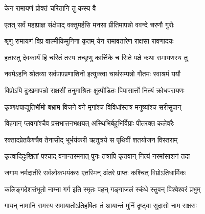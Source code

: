  

\onelineshloka
{केन रामायणं प्रोक्तं चरितानि तु कस्य वै}%

 

\twolineshloka
{एतत् सर्वं महाप्राज्ञ संक्षेपाद् वक्तुमर्हसि}
{मनसा प्रीतिमापन्नो ववन्दे चरणौ गुरोः}%

 


\twolineshloka
{श्रृणु रामायणं विप्र वाल्मीकिमुनिना कृतम्}
{येन रामावतारेण राक्षसा रावणादयः}%

 

\twolineshloka
{हतास्तु देवकार्यं हि चरितं तस्य तच्छृणु}
{कार्त्तिके च सिते पक्षे कथा रामायणस्य तु}%

 

\twolineshloka
{नवमेऽहनि श्रोतव्या सर्वपापप्रणाशिनी}
{इत्युक्त्वा चार्थसम्पन्नो गौतमः स्वाश्रमं ययौ}%

 

\twolineshloka
{विप्रोऽपि दुःखमापन्नो राक्षसीं तनुमाश्रितः}
{क्षुत्पीडितः पिपासार्त्तो नित्यं क्रोधपरायणः}%

 

\twolineshloka
{कृष्णक्षपाद्युतिर्भीमो बभ्राम विजने वने}
{मृगांश्च विविधांस्तत्र मनुष्यांश्च सरीसुपान्}%

 

\twolineshloka
{विहगान् प्लवगांश्चैव प्रसभात्तनभक्षयत्}
{अस्थिभिर्बहुभिर्विप्राः पीतरक्त कलेवरैः}%

 

\twolineshloka
{रक्तादप्रेतकैश्चैव तेनासीद् भूर्भयंकरी}
{ऋतुत्रये स पृथिवीं शतयोजन विस्तराम्}%

 

\twolineshloka
{कृत्वादिदुःखितां पश्चाद् वनान्तरमगात् पुनः}
{तत्रापि कृतवान् नित्यं नरमांसाशनं तदा}%

 

\twolineshloka
{जगाम नर्मदातीरे सर्वलोकभयंकरः}
{एतस्मिन् अंतरे प्राप्तः कश्चित् विप्रोऽतिधार्मिकः}%

 

\twolineshloka
{कलिङ्गदेशसंभूतो नाम्ना गर्ग इति स्मृतः}
{वहन् गङ्गाजलं स्कंधे स्तुवन् विश्वेश्वरं प्रभुम्}%

 

\twolineshloka
{गायन् नामानि रामस्य समायातोऽतिहर्षितः}
{तं आयान्तं मुनिं दृष्ट्वा सुदासो नाम राक्षसः}%

 

